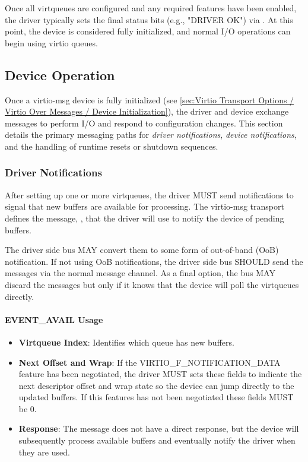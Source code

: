 Once all virtqueues are configured and any required features have been enabled,
the driver typically sets the final status bits (e.g., "DRIVER OK") via
. At this point, the device is considered fully
initialized, and normal I/O operations can begin using virtio queues.

\subsection{Device Operation}
\label{sec:Virtio Transport Options / Virtio Over Messages / Device Operation}

Once a virtio-msg device is fully initialized (see
\ref{sec:Virtio Transport Options / Virtio Over Messages / Device Initialization}),
the driver and device exchange messages to perform I/O and respond to
configuration changes. This section details the primary messaging paths for
\emph{driver notifications}, \emph{device notifications}, and the handling of
runtime resets or shutdown sequences.

\subsubsection{Driver Notifications}
\label{sec:Virtio Transport Options / Virtio Over Messages / Device Operation / Driver Notifications}

After setting up one or more virtqueues, the driver MUST send notifications
to signal that new buffers are available for processing. The virtio-msg transport
defines the message, , that the driver will use to
notify the device of pending buffers.

The driver side bus MAY convert them to some form of
out-of-band (OoB) notification.  If not using OoB notifications, the driver
side bus SHOULD send the messages via the normal message channel.
As a final option, the bus MAY discard the messages but only if it knows
that the device will poll the virtqueues directly.

\paragraph{EVENT\_AVAIL Usage}
\begin{itemize}
  \item \textbf{Virtqueue Index}: Identifies which queue has new buffers.
  \item \textbf{Next Offset and Wrap}: If the VIRTIO_F_NOTIFICATION_DATA feature
        has been negotiated, the driver MUST sets these fields to
        indicate the next descriptor offset and wrap state
        so the device can jump directly to the updated buffers.
        If this features has not been negotiated these fields MUST be 0.
  \item \textbf{Response}: The  message does not have a
        direct response, but the device will subsequently process available
        buffers and eventually notify the driver when they are used.
\end{itemize}

